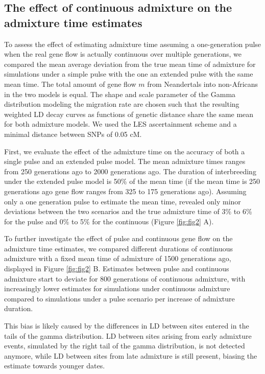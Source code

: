 \documentclass[]{article}
\begin{document}
\subsection{The effect of continuous admixture on the admixture time estimates}\label{the effect of continuous admixture on the admixture time estimates}


To assess the effect of estimating admixture time assuming a one-generation pulse when the real gene flow is actually continuous over multiple generations,
we compared the mean average deviation from the true mean time of admixture for simulations under a simple pulse with the one an extended pulse with the same mean time.
The total amount of gene flow \(m\) from Neandertals into non-Africans
in the two models is equal. 
The shape and scale parameter of the Gamma distribution modeling the migration rate are chosen such
that the resulting weighted LD decay curves as functions of genetic
distance share the same mean for both admixture models. We used the LES ascertainment scheme and a minimal distance between SNPs of 0.05 cM. 

First, we evaluate the effect of the admixture time on the accuracy of both a single pulse and an extended pulse model. The mean admixture times ranges
from 250 generations ago to 2000 generations ago.  The duration
of interbreeding under the extended pulse model is 50\% of the mean time (if the
mean time is 250 generations ago gene flow ranges from 325 to 175
generations ago). Assuming only a one generation pulse to estimate the
mean time, revealed only minor deviations between the two scenarios and
the true admixture time of 3\% to 6\% for the pulse and 0\% to 5\% for
the continuous (Figure \ref{fig:fig2} A).



To
further investigate the effect of pulse and continuous gene flow on the
admixture time estimates, we compared different durations of continuous
admixture with a fixed mean time of admixture of 1500
generations ago, displayed in Figure \ref{fig:fig2} B. Estimates between
pulse and continuous admixture start to deviate for 800 generations of
continuous admixture, with increasingly lower estimates for simulations
under continuous admixture compared to simulations under a pulse scenario per increase of admixture duration.

This bias is likely caused
by the differences in LD between sites entered in the tails of the gamma
distribution. LD between sites arising from early admixture events,
simulated by the right tail of the gamma distribution, is not detected
anymore, while LD between sites from late admixture is still present,
biasing the estimate towards younger dates. 
\end{document}
